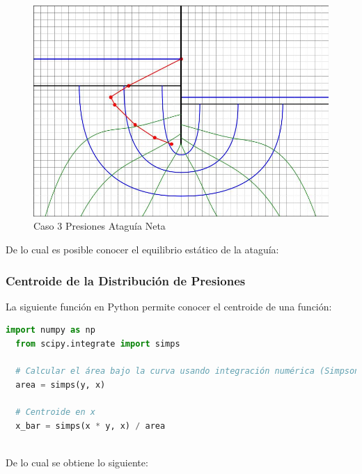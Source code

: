 \begin{figure}[H]
\begin{minipage}{0.32\textwidth}
      \includegraphics[width=\textwidth]{FOTOS/caso_3_presion_ataquia_neta.jpg}
      \caption{Caso 3 Presiones Ataguía Neta}
  \end{minipage}
\end{figure}

De lo cual es posible conocer el equilibrio estático de la ataguía:

\subsubsection{Centroide de la Distribución de Presiones}

La siguiente función en Python permite conocer el centroide de una función:

\begin{lstlisting}[language=Python]
  import numpy as np
  from scipy.integrate import simps

  # Calcular el área bajo la curva usando integración numérica (Simpson)
  area = simps(y, x)

  # Centroide en x
  x_bar = simps(x * y, x) / area
  
\end{lstlisting}

De lo cual se obtiene lo siguiente:

